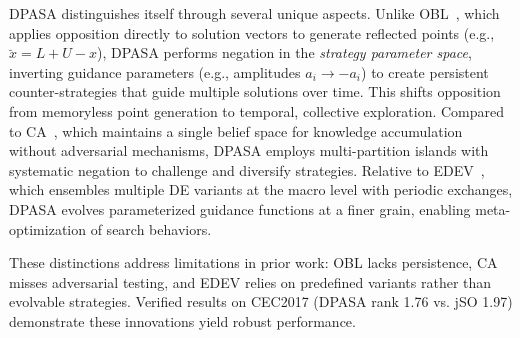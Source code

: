 \documentclass[11pt]{article}
\begin{document}
\begin{table}[ht]
\centering
\caption{Comparison of DPASA with Opposition-Based Learning (OBL), Cultural Algorithms (CA), and Ensemble DE (EDEV).}
\label{tab:novelty_comparison}
\end{table}

DPASA distinguishes itself through several unique aspects. Unlike OBL~\citep{tizhoosh2005opposition}, which applies opposition directly to solution vectors to generate reflected points (e.g., $\breve{x} = L + U - x$), DPASA performs negation in the \textit{strategy parameter space}, inverting guidance parameters (e.g., amplitudes $a_i \to -a_i$) to create persistent counter-strategies that guide multiple solutions over time. This shifts opposition from memoryless point generation to temporal, collective exploration. Compared to CA~\citep{reynolds1994introduction}, which maintains a single belief space for knowledge accumulation without adversarial mechanisms, DPASA employs multi-partition islands with systematic negation to challenge and diversify strategies. Relative to EDEV~\citep{wu2018edev}, which ensembles multiple DE variants at the macro level with periodic exchanges, DPASA evolves parameterized guidance functions at a finer grain, enabling meta-optimization of search behaviors.

These distinctions address limitations in prior work: OBL lacks persistence, CA misses adversarial testing, and EDEV relies on predefined variants rather than evolvable strategies. Verified results on CEC2017 (DPASA rank 1.76 vs. jSO 1.97) demonstrate these innovations yield robust performance.
\end{document}
